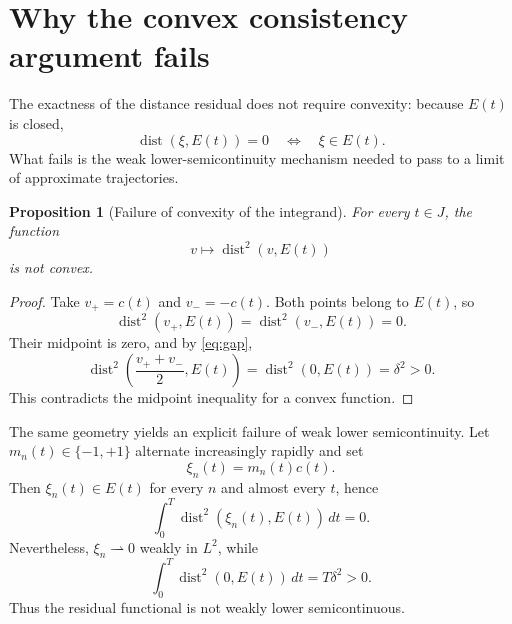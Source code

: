 \documentclass[11pt]{article}
\newtheorem{proposition}{Proposition}[section]
\newcommand{\dist}{\operatorname{dist}}
\begin{document}
\section{Why the convex consistency argument fails}

The exactness of the distance residual does not require convexity: because $E(t)$ is closed,
\begin{equation}
    \dist(\xi,E(t))=0
    \quad\Longleftrightarrow\quad
    \xi\in E(t).
\end{equation}
What fails is the weak lower-semicontinuity mechanism needed to pass to a limit of approximate trajectories.

\begin{proposition}[Failure of convexity of the integrand]
For every $t\in J$, the function
\begin{equation}
    v\longmapsto \dist^2(v,E(t))
\end{equation}
 is not convex.
\end{proposition}

\begin{proof}
Take $v_+=c(t)$ and $v_-=-c(t)$. Both points belong to $E(t)$, so
\begin{equation}
    \dist^2(v_+,E(t))=\dist^2(v_-,E(t))=0.
\end{equation}
Their midpoint is zero, and by \eqref{eq:gap},
\begin{equation}
    \dist^2\!\left(\frac{v_++v_-}{2},E(t)\right)
    =\dist^2(0,E(t))
    =\delta^2>0.
\end{equation}
This contradicts the midpoint inequality for a convex function.
\end{proof}

The same geometry yields an explicit failure of weak lower semicontinuity. Let $m_n(t)\in\{-1,+1\}$ alternate increasingly rapidly and set
\begin{equation}
    \xi_n(t)=m_n(t)c(t).
    \label{eq:chattering_selector}
\end{equation}
Then $\xi_n(t)\in E(t)$ for every $n$ and almost every $t$, hence
\begin{equation}
    \int_0^T\dist^2(\xi_n(t),E(t))\,dt=0.
    \label{eq:zero_res_n}
\end{equation}
Nevertheless, $\xi_n\rightharpoonup 0$ weakly in $L^2$, while
\begin{equation}
    \int_0^T\dist^2(0,E(t))\,dt=T\delta^2>0.
    \label{eq:lsc_failure}
\end{equation}
Thus the residual functional is not weakly lower semicontinuous.
\end{document}
